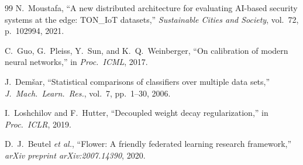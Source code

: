 \documentclass[12pt,a4paper]{article}
\theoremstyle{definition}
\theoremstyle{remark}
\begin{document}
\begin{thebibliography}{99}
N.~Moustafa, ``A new distributed architecture for evaluating {AI}-based security systems at the edge: {TON\_IoT} datasets,'' \emph{Sustainable Cities and Society}, vol.~72, p.~102994, 2021.

C.~Guo, G.~Pleiss, Y.~Sun, and K.~Q.~Weinberger, ``On calibration of modern neural networks,'' in \emph{Proc.\ ICML}, 2017.

J.~Dem\v{s}ar, ``Statistical comparisons of classifiers over multiple data sets,'' \emph{J.\ Mach.\ Learn.\ Res.}, vol.~7, pp.~1--30, 2006.

I.~Loshchilov and F.~Hutter, ``Decoupled weight decay regularization,'' in \emph{Proc.\ ICLR}, 2019.

D.~J.~Beutel \emph{et al.}, ``{Flower}: A friendly federated learning research framework,'' \emph{arXiv preprint arXiv:2007.14390}, 2020.

\end{thebibliography}


\end{document}
